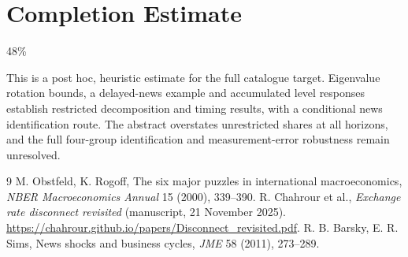 \documentclass[11pt]{article}
\theoremstyle{definition}
\begin{document}
\section{Completion Estimate}
48\%

This is a post hoc, heuristic estimate for the full catalogue target.
Eigenvalue rotation bounds, a delayed-news example and accumulated level responses establish restricted decomposition and timing results, with a conditional news identification route. The abstract overstates unrestricted shares at all horizons, and the full four-group identification and measurement-error robustness remain unresolved.

\begin{thebibliography}{9}
 M. Obstfeld, K. Rogoff, The six major puzzles in international macroeconomics, \emph{NBER Macroeconomics Annual} 15 (2000), 339--390.
 R. Chahrour et al., \emph{Exchange rate disconnect revisited} (manuscript, 21 November 2025). \url{https://chahrour.github.io/papers/Disconnect_revisited.pdf}.
 R. B. Barsky, E. R. Sims, News shocks and business cycles, \emph{JME} 58 (2011), 273--289.
\end{thebibliography}
\end{document}
